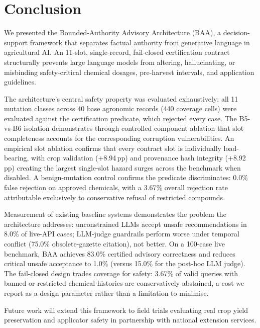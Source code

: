 
\section{Conclusion}
\label{sec:conclusion}

We presented the Bounded-Authority Advisory Architecture (BAA), a decision-support framework that separates factual authority from generative language in agricultural AI. An 11-slot, single-record, fail-closed certification contract structurally prevents large language models from altering, hallucinating, or misbinding safety-critical chemical dosages, pre-harvest intervals, and application guidelines.

The architecture's central safety property was evaluated exhaustively: all 11 mutation classes across 40 base agronomic records (440 coverage cells) were evaluated against the certification predicate, which rejected every case. The B5-vs-B6 isolation demonstrates through controlled component ablation that slot completeness accounts for the corresponding corruption vulnerabilities. An empirical slot ablation confirms that every contract slot is individually load-bearing, with crop validation ($+$8.94\,pp) and provenance hash integrity ($+$8.92\,pp) creating the largest single-slot hazard surges across the benchmark when disabled. A benign-mutation control confirms the predicate discriminates: 0.0\% false rejection on approved chemicals, with a 3.67\% overall rejection rate attributable exclusively to conservative refusal of restricted compounds.

Measurement of existing baseline systems demonstrates the problem the architecture addresses: unconstrained LLMs accept unsafe recommendations in 8.0\% of live-API cases; LLM-judge guardrails perform worse under temporal conflict (75.0\% obsolete-gazette citation), not better. On a 100-case live benchmark, BAA achieves 83.0\% certified advisory correctness and reduces critical unsafe acceptance to 1.0\% (versus 15.0\% for the post-hoc LLM judge). The fail-closed design trades coverage for safety: 3.67\% of valid queries with banned or restricted chemical histories are conservatively abstained, a cost we report as a design parameter rather than a limitation to minimise.

Future work will extend this framework to field trials evaluating real crop yield preservation and applicator safety in partnership with national extension services.